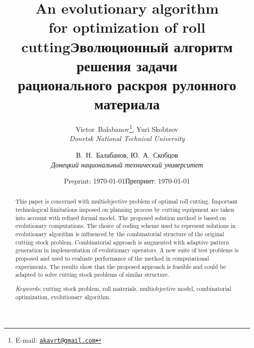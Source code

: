 \documentclass[12pt]{article}
\begin{document}
\title{An evolutionary algorithm\\
for optimization of roll cutting}

\author{Victor~Balabanov\thanks{E-mail: \href{mailto:akavrt@gmail.com}
{\nolinkurl{akavrt@gmail.com}}}, 
Yuri Skobtsov\\ [1.0ex]
\normalsize\textit{Donetsk National Technical University}
}

\date{Preprint: \today}


\begin{titlepage}
\clearpage\maketitle
\thispagestyle{empty}

\begin{abstract}
This paper is concerned with multiobjective problem of optimal roll cutting. 
Important technological limitations imposed on planning process by cutting 
equipment are taken into account with refined formal model. The proposed 
solution method is based on evolutionary computations. The choice of coding 
scheme used to represent solutions in evolutionary algorithm is influenced 
by the combinatorial structure of the original cutting stock problem. 
Combinatorial approach is augmented with adaptive pattern generation in 
implementation of evolutionary operators. A new suite of test problems is 
proposed and used to evaluate performance of the method in computational 
experiments. The results show that the proposed approach is feasible and 
could be adapted to solve cutting stock problems of similar structure.
\smallskip

\noindent\textit{Keywords:} cutting stock problem, roll materials, 
multiobjective model, combinatorial optimization, evolutionary algorithm.
\end{abstract}   
\end{titlepage}

\title{Эволюционный алгоритм решения задачи\\
рационального раскроя рулонного материала}

\author{В.~Н.~Балабанов\footnotemark[1], Ю.~А.~Скобцов\\ [1.0ex]
\normalsize\textit{Донецкий национальный технический университет}
}

\date{Препринт: \today}

\maketitle
\end{document}
